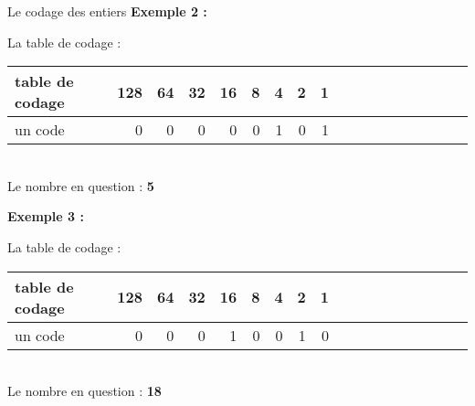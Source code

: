 \begin{frame}{Le codage des entiers}
    \textbf{Exemple 2 :}
    \begin{center}
        La table de codage : \\
        $\;$\\
        \begin{tabular}{|*{2}{l||r|r|r|r|r|r|r|r|}}
            \hline
                table de codage & 128 & 64 & 32 & 16 & 8 & 4 & 2 & 1 \\
            \hline
                un code         & 0   & 0  & 0  & 0  & 0 & 1 & 0 & 1 \\
            \hline
        \end{tabular} \\
        $\;$\\
        Le nombre en question : \textbf{5} \\
    \end{center}
    \textbf{Exemple 3 :}
    \begin{center}
        La table de codage : \\
        $\;$\\
        \begin{tabular}{|*{2}{l||r|r|r|r|r|r|r|r|}}
            \hline
                table de codage & 128 & 64 & 32 & 16 & 8 & 4 & 2 & 1 \\
            \hline
                un code         & 0   & 0  & 0  & 1  & 0 & 0 & 1 & 0 \\
            \hline
        \end{tabular} \\
        $\;$\\
        Le nombre en question : \textbf{18} \\
    \end{center}
\end{frame}


